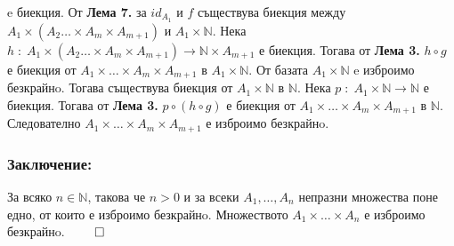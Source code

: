 \documentclass[a4paper, 12pt, oneside]{article}
\newcommand{\N}{\mathbb{N}}
\begin{document}
e биекция.
От \textbf{Лема 7.} за \(id_{A_1}\) и \(f\) съществува биекция между
\(A_1 \times (A_2 \dots \times A_m \times A_{m + 1})\) и \(A_1 \times \N\).
Нека \(h \; : \; A_1 \times (A_2 \dots \times A_m \times A_{m + 1}) \to \N \times A_{m + 1}\) е биекция.
Тогава от \textbf{Лема 3.} \(h \circ g\) е биекция
от \(A_1 \times \dots \times A_m \times A_{m + 1}\) в \(A_1 \times \N\).
От базата \(A_1 \times \N\) e изброимо безкрайнo.
Тогава съществува биекция от \(A_1 \times \N\) в \(\N\).
Нека \(p \; : \; A_1 \times \N \to \N\) е биекция.
Тогава от \textbf{Лема 3.} \(p \circ (h \circ g)\) е биекция
от \(A_1 \times \dots \times A_m \times A_{m + 1}\) в \(\N\).
Следователно \(A_1 \times \dots \times A_m \times A_{m + 1}\) е изброимо безкрайнo.
\subsubsection*{Заключение:}
За всяко \(n \in \N\), такова че \(n > 0\) и за всеки \(A_1, \dots, A_n\) непразни множества
поне едно, от които е изброимо безкрайнo.
Множеството \(A_1 \times \dots \times A_n\) е изброимо безкрайнo. \(\qed\)
\end{document}

